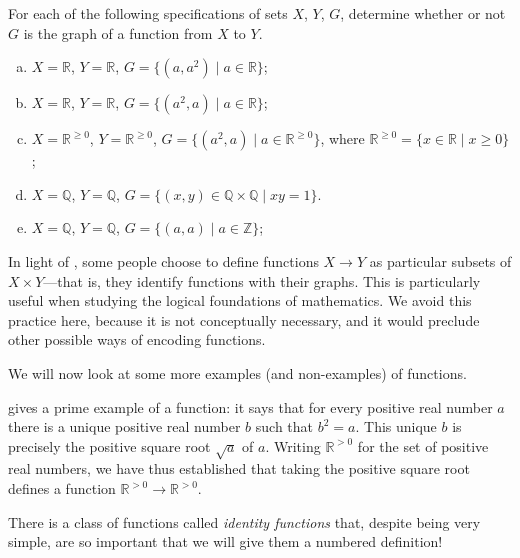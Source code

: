 \begin{exercise}
For each of the following specifications of sets $X$, $Y$, $G$, determine whether or not $G$ is the graph of a function from $X$ to $Y$.
\begin{enumerate}[(a)]
\item $X = \mathbb{R}$, $Y = \mathbb{R}$, $G = \{ (a, a^2) \mid a \in \mathbb{R} \}$;
\item $X = \mathbb{R}$, $Y = \mathbb{R}$, $G = \{ (a^2, a) \mid a \in \mathbb{R} \}$;
\item $X = \mathbb{R}^{\ge 0}$, $Y = \mathbb{R}^{\ge 0}$, $G = \{ (a^2, a) \mid a \in \mathbb{R}^{\ge 0} \}$, where $\mathbb{R}^{\ge 0} = \{ x \in \mathbb{R} \mid x \ge 0 \}$;
\item $X = \mathbb{Q}$, $Y = \mathbb{Q}$, $G = \{ (x, y) \in \mathbb{Q} \times \mathbb{Q} \mid xy = 1 \}$.
\item $X = \mathbb{Q}$, $Y = \mathbb{Q}$, $G = \{ (a, a) \mid a \in \mathbb{Z} \}$;
\end{enumerate}
\end{exercise}

\begin{aside}
In light of , some people choose to define functions $X \to Y$ as particular subsets of $X \times Y$---that is, they identify functions with their graphs. This is particularly useful when studying the logical foundations of mathematics. We avoid this practice here, because it is not conceptually necessary, and it would preclude other possible ways of encoding functions.
\end{aside}

We will now look at some more examples (and non-examples) of functions.

\begin{example} \label{exFirstExamplesOfFunctions}
 gives a prime example of a function: it says that for every positive real number $a$ there is a unique positive real number $b$ such that $b^2=a$. This unique $b$ is precisely the positive square root $\sqrt{a}$ of $a$. Writing $\mathbb{R}^{>0}$ for the set of positive real numbers, we have thus established that taking the positive square root defines a function $\mathbb{R}^{>0} \to \mathbb{R}^{>0}$.
\end{example}

There is a class of functions called \textit{identity functions} that, despite being very simple, are so important that we will give them a numbered definition!

